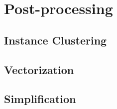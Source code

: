 \chapter{Post-processing}

\section{Instance Clustering}


\section{Vectorization}


\section{Simplification}

